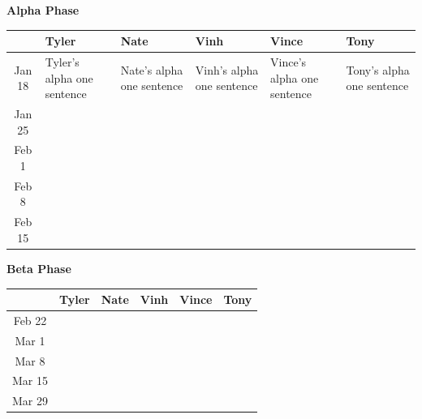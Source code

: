 \documentclass{extarticle}
\begin{document}
\begin{center}
\bf{Alpha Phase}
\begin{table}[H]
\begin{tabular}{ c || p{3cm} | p{3cm} | p{3cm} | p{3cm} | p{3cm} |}
 & \bf{Tyler} & \bf{Nate} & \bf{Vinh} & \bf{Vince} & \bf{Tony} \\ \hline
Jan 18 & Tyler's alpha one sentence & Nate's alpha one sentence & Vinh's alpha one sentence& Vince's alpha one
sentence & Tony's alpha one sentence \\ \hline
Jan 25 &          &            &            &              &            \\ \hline
Feb 1  &          &            &            &              &            \\ \hline
Feb 8  &          &            &            &              &            \\ \hline
Feb 15 &          &            &            &              &            \\ \hline
\end{tabular}
\end{table}
\end{center}

\begin{center}
\bf{Beta Phase}
\begin{table}[H]
\begin{tabular}{ c || p{3cm} | p{3cm} | p{3cm} | p{3cm} | p{3cm} |}
 & \bf{Tyler} & \bf{Nate} & \bf{Vinh} & \bf{Vince} & \bf{Tony} \\ \hline
Feb 22 &          &            &            &              &            \\ \hline
Mar 1  &          &            &            &              &            \\ \hline
Mar 8  &          &            &            &              &            \\ \hline
Mar 15 &          &            &            &              &            \\ \hline
Mar 29 &          &            &            &              &            \\ \hline
\end{tabular}
\end{table}
\end{center}
\end{document}
